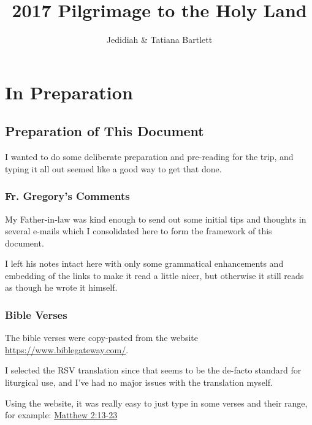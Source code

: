 \documentclass[letterpaper]{report}
\title{2017 Pilgrimage to the Holy Land}
\author{Jedidiah \& Tatiana Bartlett}
\date{}
\begin{document}
\maketitle
\tableofcontents

\listoffigures
\chapter{In Preparation}

\section{Preparation of This Document}
I wanted to do some deliberate preparation and pre-reading for the trip,
and typing it all out seemed like a good way to get that done.

\subsection{Fr. Gregory's Comments}
My Father-in-law was kind enough to send out some initial tips and thoughts
in several e-mails which  I consolidated here to form the framework of this 
document.

I left his notes intact here with only some grammatical enhancements and
embedding of the links to make it read a little nicer,
but otherwise it still reads as though he wrote it himself.

\subsection{Bible Verses}
The bible verses were copy-pasted from the website \url{https://www.biblegateway.com/}.

I selected the RSV translation since that seems to be the de-facto standard
for liturgical use, and I've had no major issues with the translation myself.

Using the website, it was really easy to just type in some verses and their
range, for example:
\href{https://www.biblegateway.com/passage/?search=Matthew+2%3A13-23&version=RSV}{
Matthew 2:13-23}
\end{document}
